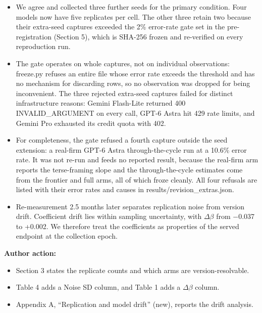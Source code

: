 \documentclass[11pt]{article}
\begin{document}
\begin{itemize}

\item We agree and collected three further seeds for the primary condition. Four models now have five replicates per cell. The other three retain two because their extra-seed captures exceeded the 2\% error-rate gate set in the pre-registration (Section 5), which is SHA-256 frozen and re-verified on every reproduction run.

\item The gate operates on whole captures, not on individual observations: freeze.py refuses an entire file whose error rate exceeds the threshold and has no mechanism for discarding rows, so no observation was dropped for being inconvenient. The three rejected extra-seed captures failed for distinct infrastructure reasons: Gemini Flash-Lite returned 400 INVALID\_ARGUMENT on every call, GPT-6 Astra hit 429 rate limits, and Gemini Pro exhausted its credit quota with 402.

\item For completeness, the gate refused a fourth capture outside the seed extension: a real-firm GPT-6 Astra through-the-cycle run at a 10.6\% error rate. It was not re-run and feeds no reported result, because the real-firm arm reports the terse-framing slope and the through-the-cycle estimates come from the frontier and full arms, all of which froze cleanly. All four refusals are listed with their error rates and causes in results/revision\_extras.json.

\item Re-measurement 2.5 months later separates replication noise from version drift. Coefficient drift lies within sampling uncertainty, with $\Delta$$\beta$ from $-$0.037 to +0.002. We therefore treat the coefficients as properties of the served endpoint at the collection epoch.

\end{itemize}

\textbf{Author action:}

\begin{itemize}

\item Section 3 states the replicate counts and which arms are version-resolvable.

\item Table 4 adds a Noise SD column, and Table 1 adds a $\Delta$$\beta$ column.

\item Appendix A, ``Replication and model drift'' (new), reports the drift analysis.

\end{itemize}
\end{document}
